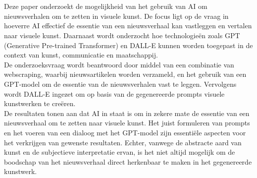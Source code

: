 \documentclass[dutch,dit,thesis]{hogentreport}
\begin{document}
%



\chapter*{}

Deze paper onderzoekt de mogelijkheid van het gebruik van AI om nieuwsverhalen om te zetten in visuele kunst. De focus ligt op de vraag in hoeverre AI effectief de essentie van een nieuwsverhaal kan vastleggen en vertalen naar visuele kunst. Daarnaast wordt onderzocht hoe technologieën zoals GPT (Generative Pre-trained Transformer) en DALL-E kunnen worden toegepast in de context van kunst, communicatie en maatschappij.\\

De onderzoeksvraag wordt beantwoord door middel van een combinatie van webscraping, waarbij nieuwsartikelen worden verzameld, en het gebruik van een GPT-model om de essentie van de nieuwsverhalen vast te leggen. Vervolgens wordt DALL-E ingezet om op basis van de gegenereerde prompts visuele kunstwerken te creëren.\\

De resultaten tonen aan dat AI in staat is om in zekere mate de essentie van een nieuwsverhaal om te zetten naar visuele kunst. Het juist formuleren van prompts en het voeren van een dialoog met het GPT-model zijn essentiële aspecten voor het verkrijgen van gewenste resultaten. Echter, vanwege de abstracte aard van kunst en de subjectieve interpretatie ervan, is het niet altijd mogelijk om de boodschap van het nieuwsverhaal direct herkenbaar te maken in het gegenereerde kunstwerk.\\
\end{document}
